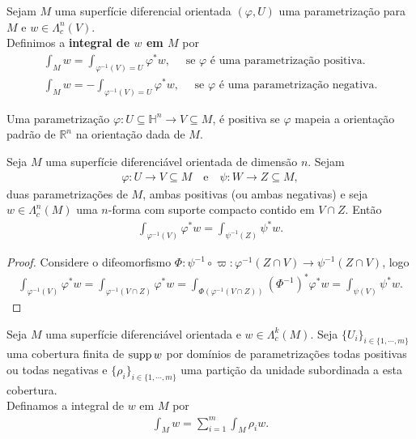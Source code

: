 \begin{definition}\label{def:7.1-integral}
  Sejam $M$ uma superfície diferencial orientada $(\varphi,U)$ uma parametrização para $M$ e $w\in\Lambda^{n}_c(V)$.\\
  Definimos a \textbf{integral de $w$ em $M$} por
  \begin{align*}
    \int_{M}w=\int_{\varphi^{-1}(V)=U}\varphi^{\ast}w,\quad\text{ se $\varphi$ é uma parametrização positiva}.\\
    \int_{M}w=-\int_{\varphi^{-1}(V)=U}\varphi^{\ast}w,\quad\text{ se $\varphi$ é uma parametrização negativa}.
  \end{align*}
\end{definition}
\begin{note}
  Uma parametrização $\varphi:U\subseteq\mathbb{H}^{n}\to V\subseteq M$, é positiva se $\varphi$ mapeia a orientação padrão de $\mathbb{R}^{n}$ na orientação dada de $M$. 
\end{note}
\begin{proposition}
  Seja $M$ uma superfície diferenciável orientada de dimensão $n$. Sejam
  \begin{align*}
    \varphi:U\to V\subseteq M\quad\text{e}\quad\psi:W\to Z\subseteq M,
  \end{align*}
  duas parametrizações de $M$, ambas positivas (ou ambas negativas) e seja $w\in\Lambda^{n}_c(M)$ uma $n$-forma com suporte compacto contido em $V\cap Z$. Então
  \begin{align*}
    \int_{\varphi^{-1}(V)}\varphi^{\ast}w=\int_{\psi^{-1}(Z)}\psi^{\ast}w.
  \end{align*}
\end{proposition}
\begin{proof} 
  Considere o difeomorfismo $\Phi:\psi^{-1}\circ\varpi:\varphi^{-1}(Z\cap V)\to\psi^{-1}(Z\cap V)$, logo
  \begin{align*}
    \int_{\varphi^{-1}(V)}\varphi^{\ast}w=\int_{\varphi^{-1}(V\cap Z)}\varphi^{\ast}w=\int_{\Phi(\varphi^{-1}(V\cap Z))}(\Phi^{-1})^{\ast}\varphi^{\ast}w=\int_{\psi(V)}\psi^{\ast}w.
  \end{align*}
\end{proof}
\begin{definition}
  Seja $M$ uma superfície diferenciável orientada e $w\in\Lambda^{k}_c(M)$. Seja $\{U_i\}_{i\in\{1,\cdots,m\}}$ uma cobertura finita de $\operatorname{supp} w$ por domínios de parametrizações todas positivas ou todas negativas e $\{\rho_i\}_{i\in\{1,\cdots,m\}}$ uma partição da unidade subordinada a esta cobertura.\\
  Definamos a integral de $w$ em $M$ por
  \begin{align*}
    \int_{M}w=\sum_{i=1}^{m}\int_{M}\rho_i w.
  \end{align*}
\end{definition}
